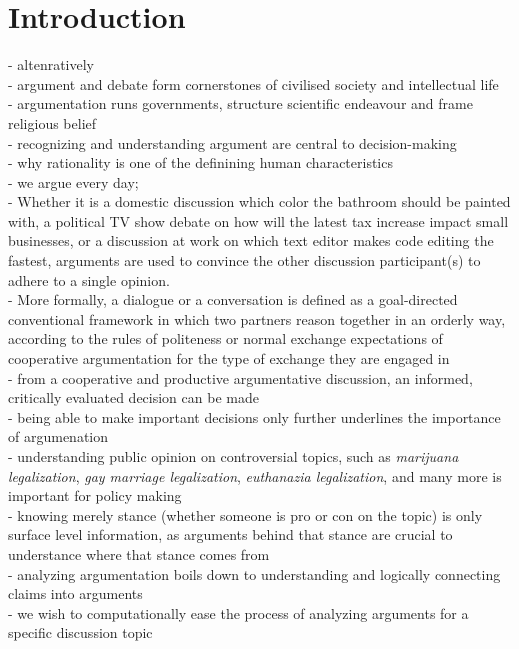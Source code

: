\chapter{Introduction}

- altenratively \\
- argument and debate form cornerstones of civilised society and 
intellectual life \\
- argumentation runs governments, structure scientific endeavour and 
frame religious belief \\
- recognizing and understanding argument are central to decision-making \\
- why rationality is one of the definining human characteristics \\

\noindent - we argue every day; \\
- Whether it is a domestic discussion which color the bathroom should 
be painted with, a political TV show debate on how will the latest tax increase 
impact small businesses, or a discussion at work on which text editor makes
code editing the fastest, arguments are used to convince the other discussion 
participant(s) to adhere to a single opinion. \\
- More formally, a dialogue or a conversation is defined as a goal-directed
conventional framework in which two partners reason 
together in an orderly way, 
according to the rules of politeness or normal exchange expectations
of cooperative argumentation for the type of exchange they are
engaged in \citep{walton1998new} \\
- from a cooperative and productive argumentative discussion, 
an informed, critically evaluated decision can be made \\
- being able to make important decisions only further 
underlines the importance of argumenation \\
- understanding public opinion on controversial topics, such as 
\textit{marijuana legalization}, \textit{gay marriage legalization}, 
\textit{euthanazia legalization}, and many more is important for
policy making \\
- knowing merely stance (whether someone is pro or con on the topic)
is only surface level information, as arguments behind that stance are
crucial to understance where that stance comes from \\
- analyzing argumentation boils down to understanding and logically connecting
claims into arguments \\
- we wish to computationally ease the process of analyzing arguments for a 
specific discussion topic \\

